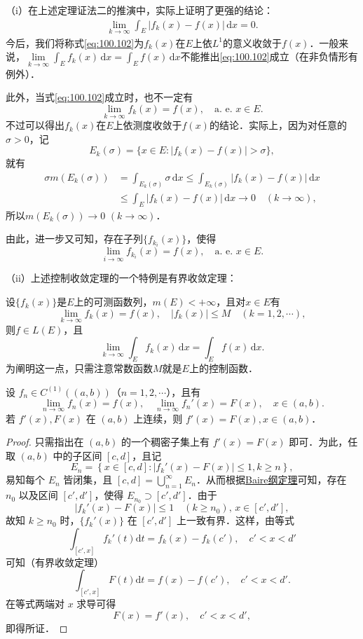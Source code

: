\documentclass[../../main.tex]{subfiles}%
\begin{document}
\begin{remark}
（i）在上述定理证法二的推演中，实际上证明了更强的结论：
\begin{align}
\lim_{k \to \infty} \int_E |f_k(x) - f(x)| \, \mathrm{d}x = 0. \label{eq:100.102}
\end{align}
今后，我们将称式\eqref{eq:100.102}为\(f_k(x)\)在\(E\)上依\(L^1\)的意义收敛于\(f(x)\)．一般来说，$\underset{k\rightarrow \infty}{\lim}\int_E{f_k(x)\,\mathrm{d}x}=\int_E{f(x)\,\mathrm{d}x}$不能推出\eqref{eq:100.102}成立（在非负情形有例外）．

此外，当式\eqref{eq:100.102}成立时，也不一定有
\[
\lim_{k \to \infty} f_k(x) = f(x), \quad \text{a. e. } x \in E.
\]
不过可以得出\(f_k(x)\)在\(E\)上依测度收敛于\(f(x)\)的结论．实际上，因为对任意的\(\sigma > 0\)，记
\[
E_k(\sigma) = \{ x \in E : |f_k(x) - f(x)| > \sigma \},
\]
就有
\begin{align*}
\sigma m(E_k(\sigma)) &= \int_{E_k(\sigma)} \sigma \, \mathrm{d}x \leqslant \int_{E_k(\sigma)} |f_k(x) - f(x)| \, \mathrm{d}x \\
&\leqslant \int_E |f_k(x) - f(x)| \, \mathrm{d}x \to 0 \quad (k \to \infty),
\end{align*}
所以\(m(E_k(\sigma)) \to 0\) \((k \to \infty)\)．

由此，进一步又可知，存在子列\(\{ f_{k_i}(x) \}\)，使得
\[
\lim_{i \to \infty} f_{k_i}(x) = f(x), \quad \text{a. e. } x \in E.
\]

（ii）上述控制收敛定理的一个特例是有界收敛定理：

设\(\{ f_k(x) \}\)是\(E\)上的可测函数列，\(m(E) < +\infty\)，且对\(x \in E\)有
\[
\lim_{k \to \infty} f_k(x) = f(x), \quad |f_k(x)| \leqslant M \quad (k = 1, 2, \cdots),
\]
则\(f \in L(E)\)，且
\[
\lim_{k \to \infty} \int_E f_k(x) \, \mathrm{d}x = \int_E f(x) \, \mathrm{d}x.
\]
为阐明这一点，只需注意常数函数\(M\)就是\(E\)上的控制函数．
\end{remark}

\begin{example}
设 \( f_n \in C^{(1)}((a,b)) \)（\( n = 1,2,\cdots \)），且有
\[
\lim_{n \to \infty} f_n(x) = f(x), \quad \lim_{n \to \infty} f_n'(x) = F(x), \quad x \in (a,b).
\]
若 \( f'(x), F(x) \) 在 \( (a,b) \) 上连续，则 \( f'(x) = F(x), x \in (a,b) \)．
\end{example}
\begin{proof}
只需指出在 \( (a,b) \) 的一个稠密子集上有 \( f'(x) = F(x) \) 即可．为此，任取 \( (a,b) \) 中的子区间 \( [c,d] \)，且记
\[
E_n = \left\{ x \in [c,d] : |f_k'(x) - F(x)| \leqslant 1, k \geqslant n \right\},
\]
易知每个 \( E_n \) 皆闭集，且 \( [c,d] = \bigcup_{n=1}^{\infty} E_n \)．从而根据\hyperref[theorem:Baire纲定理]{Baire纲定理}可知，存在 \( n_0 \) 以及区间 \( [c',d'] \)，使得 \( E_{n_0} \supset [c',d'] \)．由于
\[
|f_k'(x) - F(x)| \leqslant 1 \quad (k \geqslant n_0), \, x \in [c',d'],
\]
故知 \( k \geqslant n_0 \) 时，\( \{ f_k'(x) \} \) 在 \( [c',d'] \) 上一致有界．这样，由等式
\[
\int_{[c',x]} f_k'(t) \mathrm{d}t = f_k(x) - f_k(c'), \quad c' < x < d'
\]
可知（有界收敛定理）
\[
\int_{[c',x]} F(t) \mathrm{d}t = f(x) - f(c'), \quad c' < x < d'.
\]
在等式两端对 \( x \) 求导可得
\[
F(x) = f'(x), \quad c' < x < d',
\]
即得所证．
\end{proof}
\end{document}
